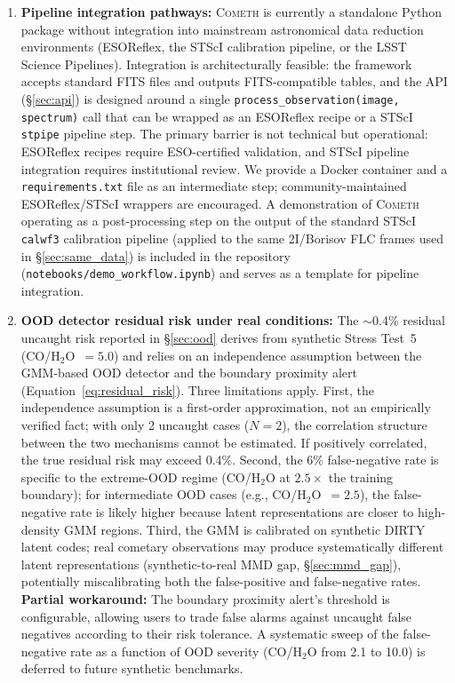 \documentclass[usenatbib]{mnras}
\begin{document}
\begin{enumerate}
    \item \textbf{Pipeline integration pathways:} \textsc{Cometh} is currently a standalone Python package without integration into mainstream astronomical data reduction environments (ESOReflex, the STScI calibration pipeline, or the LSST Science Pipelines). Integration is architecturally feasible: the framework accepts standard FITS files and outputs FITS-compatible tables, and the API (\S\ref{sec:api}) is designed around a single \texttt{process\_observation(image, spectrum)} call that can be wrapped as an ESOReflex recipe or a STScI \texttt{stpipe} pipeline step. The primary barrier is not technical but operational: ESOReflex recipes require ESO-certified validation, and STScI pipeline integration requires institutional review. We provide a Docker container and a \texttt{requirements.txt} file as an intermediate step; community-maintained ESOReflex/STScI wrappers are encouraged. A demonstration of \textsc{Cometh} operating as a post-processing step on the output of the standard STScI \texttt{calwf3} calibration pipeline (applied to the same 2I/Borisov FLC frames used in \S\ref{sec:same_data}) is included in the repository (\texttt{notebooks/demo\_workflow.ipynb}) and serves as a template for pipeline integration.
    \item \textbf{OOD detector residual risk under real conditions:} The $\sim$0.4\% residual uncaught risk reported in \S\ref{sec:ood} derives from synthetic Stress Test~5 (CO/H$_2$O~$=5.0$) and relies on an independence assumption between the GMM-based OOD detector and the boundary proximity alert (Equation~\ref{eq:residual_risk}). Three limitations apply. First, the independence assumption is a first-order approximation, not an empirically verified fact; with only 2 uncaught cases ($N=2$), the correlation structure between the two mechanisms cannot be estimated. If positively correlated, the true residual risk may exceed 0.4\%. Second, the 6\% false-negative rate is specific to the extreme-OOD regime (CO/H$_2$O at $2.5\times$ the training boundary); for intermediate OOD cases (e.g., CO/H$_2$O~$=2.5$), the false-negative rate is likely higher because latent representations are closer to high-density GMM regions. Third, the GMM is calibrated on synthetic DIRTY latent codes; real cometary observations may produce systematically different latent representations (synthetic-to-real MMD gap, \S\ref{sec:mmd_gap}), potentially miscalibrating both the false-positive and false-negative rates. \textbf{Partial workaround:} The boundary proximity alert's threshold is configurable, allowing users to trade false alarms against uncaught false negatives according to their risk tolerance. A systematic sweep of the false-negative rate as a function of OOD severity (CO/H$_2$O from 2.1 to 10.0) is deferred to future synthetic benchmarks.
\end{enumerate}
\end{document}
